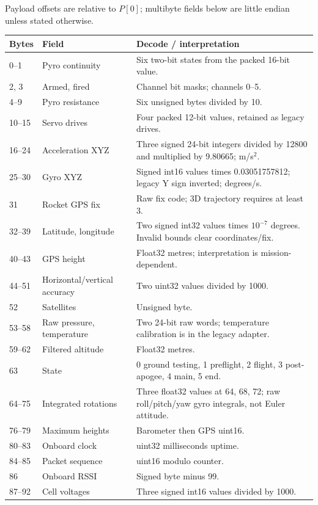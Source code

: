 Payload offsets are relative to \(P[0]\); multibyte fields below are little
endian unless stated otherwise.
\begin{longtable}{@{}L{.14\linewidth}L{.31\linewidth}L{.48\linewidth}@{}}
\toprule Bytes & Field & Decode / interpretation \\\midrule{}--1 & Pyro continuity & Six two-bit states from the packed 16-bit value. \\
2, 3 & Armed, fired & Channel bit masks; channels 0--5. \\
4--9 & Pyro resistance & Six unsigned bytes divided by 10. \\
10--15 & Servo drives & Four packed 12-bit values, retained as legacy drives. \\
16--24 & Acceleration XYZ & Three signed 24-bit integers divided by 12800 and multiplied by 9.80665; m/s$^2$. \\
25--30 & Gyro XYZ & Signed int16 values times 0.03051757812; legacy Y sign inverted; degrees/s. \\
31 & Rocket GPS fix & Raw fix code; 3D trajectory requires at least 3. \\
32--39 & Latitude, longitude & Two signed int32 values times $10^{-7}$ degrees. Invalid bounds clear coordinates/fix. \\
40--43 & GPS height & Float32 metres; interpretation is mission-dependent. \\
44--51 & Horizontal/vertical accuracy & Two uint32 values divided by 1000. \\
52 & Satellites & Unsigned byte. \\
53--58 & Raw pressure, temperature & Two 24-bit raw words; temperature calibration is in the legacy adapter. \\
59--62 & Filtered altitude & Float32 metres. \\
63 & State & 0 ground testing, 1 preflight, 2 flight, 3 post-apogee, 4 main, 5 end. \\
64--75 & Integrated rotations & Three float32 values at 64, 68, 72; raw roll/pitch/yaw gyro integrals, not Euler attitude. \\
76--79 & Maximum heights & Barometer then GPS uint16. \\
80--83 & Onboard clock & uint32 milliseconds uptime. \\
84--85 & Packet sequence & uint16 modulo counter. \\
86 & Onboard RSSI & Signed byte minus 99. \\
87--92 & Cell voltages & Three signed int16 values divided by 1000. \\

\end{longtable}
